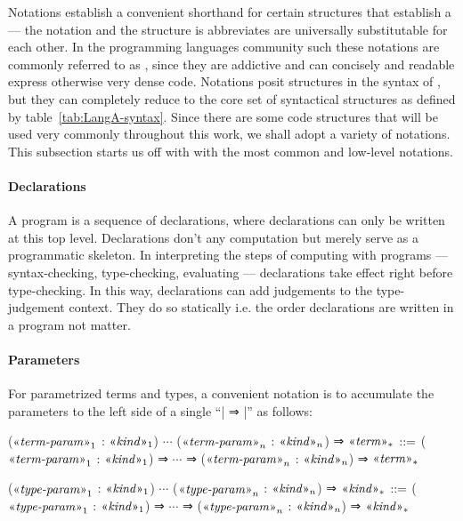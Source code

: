 
Notations establish a convenient shorthand for certain structures that establish a  --- the notation and the structure is abbreviates are universally substitutable for each other.
In the programming languages community such these notations are commonly referred to as , since they are addictive and can concisely and readable express otherwise very dense code.
Notations posit  structures in the syntax of \LangA, but they can completely reduce to the core set of syntactical structures as defined by table~\ref{tab:LangA-syntax}.
Since there are some code structures that will be used very commonly throughout this work, we shall adopt a variety of notations.
This subsection starts us off with with the most common and low-level notations.


\paragraph{Declarations}

A \LangA program is a sequence of declarations, where declarations can only be written at this top level.
Declarations don't  any computation but merely serve as a programmatic skeleton.
In interpreting the steps of computing \LangA with programs --- syntax-checking, type-checking, evaluating --- declarations take effect right before type-checking.
In this way, declarations can add judgements to the type-judgement context.
They do so statically i.e. the order declarations are written in a program not matter.

\paragraph{Parameters}
For parametrized terms and types, a convenient notation is to accumulate the parameters to the left side of a single ``\code| ⇒ |'' as follows:
\begin{notational}[caption={Notation for multiple parameters}]
($\mvar{term-param}_1$ : $\mvar{kind}_1$) $\cdots$ ($\mvar{term-param}_n$ : $\mvar{kind}_n$) ⇒ $\mvar{term}_*$
  $\syneq$
    ($\mvar{term-param}_1$ : $\mvar{kind}_1$) ⇒ $\cdots$ ⇒ ($\mvar{term-param}_n$ : $\mvar{kind}_n$) ⇒ $\mvar{term}_*$

($\mvar{type-param}_1$ : $\mvar{kind}_1$) $\cdots$ ($\mvar{type-param}_n$ : $\mvar{kind}_n$) ⇒ $\mvar{kind}_*$
  $\syneq$
    ($\mvar{type-param}_1$ : $\mvar{kind}_1$) ⇒ $\cdots$ ⇒ ($\mvar{type-param}_n$ : $\mvar{kind}_n$) ⇒ $\mvar{kind}_*$
\end{notational}

